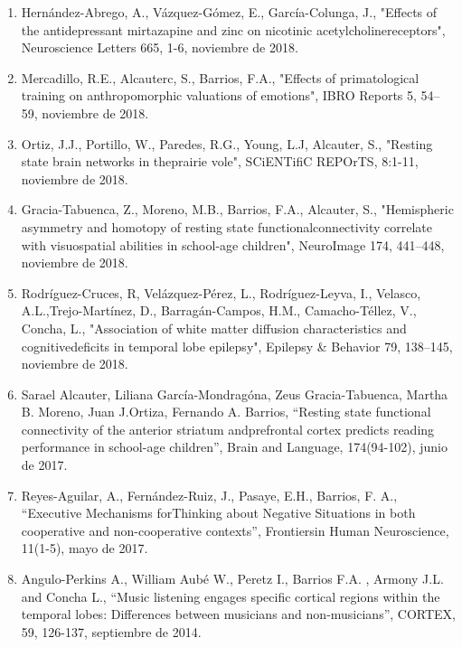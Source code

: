 \begin{enumerate}
\item Hernández-Abrego, A., Vázquez-Gómez, E., García-Colunga, J., "Effects of the antidepressant mirtazapine and zinc on 
nicotinic acetylcholinereceptors", Neuroscience Letters 665, 1-6, noviembre de 2018.

\item Mercadillo, R.E., Alcauterc, S., Barrios, F.A., "Effects of primatological training on anthropomorphic valuations of 
emotions", IBRO Reports 5, 54–59, noviembre de 2018.

\item Ortiz, J.J., Portillo, W., Paredes, R.G., Young, L.J, Alcauter, S., "Resting state brain networks in theprairie 
vole", 
SCiENTifiC REPOrTS, 8:1-11, noviembre de 2018.

\item Gracia-Tabuenca, Z., Moreno, M.B., Barrios, F.A., Alcauter, S., "Hemispheric asymmetry and homotopy of resting state 
functionalconnectivity correlate with visuospatial abilities in school-age children", NeuroImage 174, 441–448, noviembre de 2018.

\item Rodríguez-Cruces, R, Velázquez-Pérez, L., Rodríguez-Leyva, I., Velasco, A.L.,Trejo-Martínez, D., Barragán-Campos, 
H.M., 
Camacho-Téllez, V., Concha, L., "Association of white matter diffusion characteristics and cognitivedeficits in temporal 
lobe epilepsy", Epilepsy \& Behavior 79, 138–145, noviembre de 2018.

\item Sarael Alcauter, Liliana García-Mondragóna, Zeus Gracia-Tabuenca, Martha B. Moreno, Juan J.Ortiza, Fernando A. 
Barrios, 
“Resting state functional connectivity of the anterior striatum andprefrontal cortex predicts reading performance in 
school-age children”, Brain and Language, 174(94-102), junio de 2017.

\item Reyes-Aguilar, A., Fernández-Ruiz, J., Pasaye, E.H., Barrios, F. A., “Executive Mechanisms forThinking about Negative 
Situations in both cooperative and non-cooperative contexts”, Frontiersin Human Neuroscience, 11(1-5), mayo de 2017.

\item Angulo-Perkins A., William Aubé W., Peretz I., Barrios F.A. , Armony J.L. and Concha L., “Music listening engages 
specific cortical regions within the temporal lobes: Differences between musicians and non-musicians”, CORTEX, 59, 
126-137, septiembre de 2014.


\end{enumerate}
